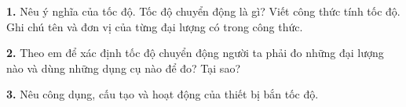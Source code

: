 \documentclass[13pt,a4paper]{article}
\begin{document}
\textbf{1.} Nêu ý nghĩa của tốc độ. Tốc độ chuyển động là gì? Viết công thức tính tốc độ. Ghi chú tên và đơn vị của từng đại lượng có trong công thức.
\par\vspace{1pt}\noindent\dotfill\par\vspace{4pt}\noindent\dotfill\par\vspace{4pt}\noindent\dotfill\par\vspace{4pt}\noindent\dotfill\par\vspace{4pt}\noindent\dotfill\par\vspace{4pt}\noindent\dotfill\par\vspace{4pt}\noindent
\textbf{2.} Theo em để xác định tốc độ chuyển động người ta phải đo những đại lượng nào và dùng những dụng cụ nào để đo? Tại sao?
\par\vspace{1pt}\noindent\dotfill\par\vspace{4pt}\noindent\dotfill\par\vspace{4pt}\noindent\dotfill\par\vspace{4pt}\noindent\dotfill\par\vspace{4pt}\noindent\dotfill\par\vspace{4pt}\noindent\dotfill\par\vspace{4pt}\noindent
\textbf{3.} Nêu công dụng, cấu tạo và hoạt động của thiết bị bắn tốc độ.
\par\vspace{1pt}\noindent\dotfill\par\vspace{4pt}\noindent\dotfill\par\vspace{4pt}\noindent\dotfill\par\vspace{4pt}\noindent\dotfill\par\vspace{4pt}\noindent\dotfill\par\vspace{4pt}\noindent\dotfill\par\vspace{4pt}\noindent\dotfill\par\vspace{4pt}\noindent
\end{document}
